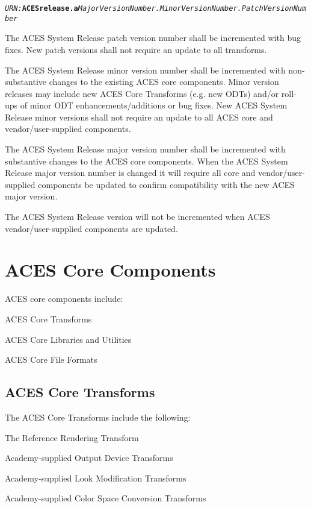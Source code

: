 \texttt{\textit{URN:}\textbf{ACESrelease.a}\textit{MajorVersionNumber.MinorVersionNumber.PatchVersionNumber}}

The ACES System Release patch version number shall be incremented with bug fixes. New patch versions shall not require an update to all transforms.

The ACES System Release minor version number shall be incremented with non-substantive changes to the existing ACES core components. Minor version releases may include new ACES Core Transforms (e.g. new ODTs) and/or roll-ups of minor ODT enhancements/additions or bug fixes. New ACES System Release minor versions shall not require an update to all ACES core and vendor/user-supplied components.

The ACES System Release major version number shall be incremented with substantive changes to the ACES core components. When the ACES System Release major version number is changed it will require all core and vendor/user-supplied components be updated to confirm compatibility with the new ACES major version.

The ACES System Release version will not be incremented when ACES vendor/user-supplied components are updated.

\section{ACES Core Components}
ACES core components include: 

\begin{listize}[-]
	\item ACES Core Transforms
	\item ACES Core Libraries and Utilities
	\item ACES Core File Formats
\end{listize}

\subsection{ACES Core Transforms}
The ACES Core Transforms include the following:

\begin{listize}[-]
	\item The Reference Rendering Transform
	\item Academy-supplied Output Device Transforms
	\item Academy-supplied Look Modification Transforms
	\item Academy-supplied Color Space Conversion Transforms
\end{listize}

